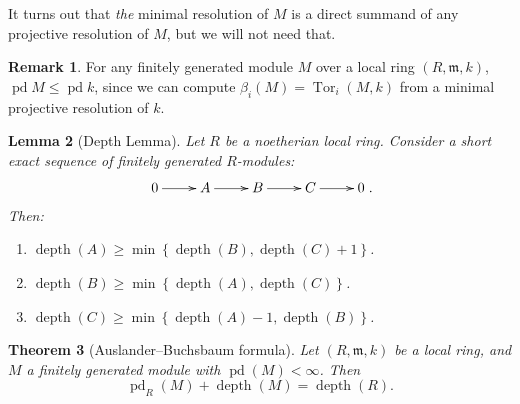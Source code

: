 \documentclass[11pt]{book}
\newtheorem{theorem}{Theorem}[chapter]
\newtheorem{lemma}[theorem]{Lemma}
\numberwithin{equation}{section}
\numberwithin{theorem}{chapter}
\theoremstyle{definition}
\newtheorem*{basic properties}{Basic Properties}
\newtheorem*{Important Remark}{Important Remark}
\newtheorem{remark}[theorem]{Remark}
\theoremstyle{remark}
\newcommand{\m}{\mathfrak{m}}
\newcommand{\Tor}{\operatorname{Tor}}
\newcommand{\depth}{\operatorname{depth}}
\newcommand{\pd}{\operatorname{pd}}
\begin{document}
It turns out that \emph{the} minimal resolution of $M$ is a direct summand of any projective resolution of $M$, but we will not need that.


\begin{remark}
	For any finitely generated module $M$ over a local ring $(R,\m,k)$, $\pd M \leqslant \pd k$, since we can compute $\beta_i(M) = \Tor_i(M,k)$ from a minimal projective resolution of $k$.
\end{remark}



\begin{lemma}[Depth Lemma]\label{depth lemma}
Let $R$ be a noetherian local ring. Consider a short exact sequence of finitely generated $R$-modules:
 $$\xymatrix{0 \ar[r] & A \ar[r] & B \ar[r] & C \ar[r] & 0}.$$
 Then:
 \begin{enumerate}[1)]
 \item $\depth(A) \geqslant \min \left\lbrace \depth(B), \depth(C) + 1 \right\rbrace$.
 \item $\depth(B) \geqslant \min \left\lbrace \depth(A), \depth(C) \right\rbrace$.
 \item $\depth(C) \geqslant \min \left\lbrace \depth(A) - 1, \depth(B) \right\rbrace$.
 \end{enumerate}
 \end{lemma}


\begin{theorem}[Auslander--Buchsbaum formula]\label{Auslander-Buchsbaum}
	Let $(R, \m, k)$ be a local ring, and $M$ a finitely generated module with $\pd(M)< \infty$. Then
	$$\pd_R(M) + \depth (M) = \depth(R).$$
\end{theorem}
\end{document}
